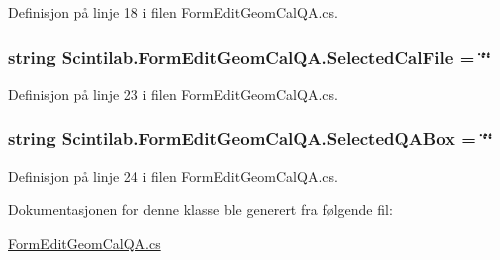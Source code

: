 Definisjon på linje 18 i filen Form\+Edit\+Geom\+Cal\+Q\+A.\+cs.

\hypertarget{class_scintilab_1_1_form_edit_geom_cal_q_a_a3b4e607ddbcc2469e57cc99ba9455398}{
\subsubsection[{Selected\+Cal\+File}]{\setlength{\rightskip}{0pt plus 5cm}string Scintilab.\+Form\+Edit\+Geom\+Cal\+Q\+A.\+Selected\+Cal\+File = \char`\"{}\char`\"{}}}\label{class_scintilab_1_1_form_edit_geom_cal_q_a_a3b4e607ddbcc2469e57cc99ba9455398}


Definisjon på linje 23 i filen Form\+Edit\+Geom\+Cal\+Q\+A.\+cs.

\hypertarget{class_scintilab_1_1_form_edit_geom_cal_q_a_a3525769c84679debd1f5181ed70e9089}{
\subsubsection[{Selected\+Q\+A\+Box}]{\setlength{\rightskip}{0pt plus 5cm}string Scintilab.\+Form\+Edit\+Geom\+Cal\+Q\+A.\+Selected\+Q\+A\+Box = \char`\"{}\char`\"{}}}\label{class_scintilab_1_1_form_edit_geom_cal_q_a_a3525769c84679debd1f5181ed70e9089}


Definisjon på linje 24 i filen Form\+Edit\+Geom\+Cal\+Q\+A.\+cs.



Dokumentasjonen for denne klasse ble generert fra følgende fil\+:\begin{DoxyCompactItemize}
\item 
\hyperlink{_form_edit_geom_cal_q_a_8cs}{Form\+Edit\+Geom\+Cal\+Q\+A.\+cs}\end{DoxyCompactItemize}
